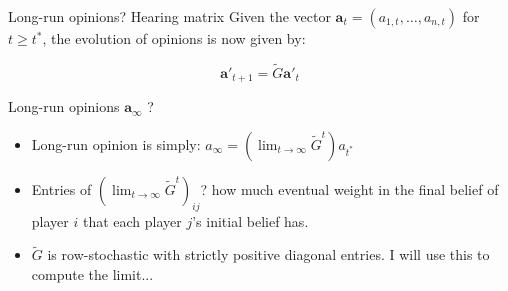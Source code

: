 \documentclass[xcolor=table,handout]{beamer}
\begin{document}
\begin{frame}{Long-run opinions? Hearing matrix}
\vspace{3mm}
Given the vector $\mathbf{a}_t = ( a_{1,t}, \ldots, a_{n,t} )$ for $t \geq t^{*}$, the evolution of opinions is now given by:

\begin{equation}
\mathbf{a'}_{t+1} = \tilde{G} \mathbf{a'}_t
\label{LRlawofmotion}
\end{equation} 
\pause
\begin{tcolorbox}[enhanced,attach boxed title to top center={yshift=-3mm,yshifttext=-1mm}, colback=red!5,colframe=red!40,colbacktitle=red!40 ,fonttitle=\bfseries, boxed title style={size=small,colframe=red!50} ]
 \centering Long-run opinions $\mathbf{a}_{\infty}$ ?   
 \end{tcolorbox}
\pause
\begin{itemize}
\item Long-run opinion is simply: $a_{\infty} = (\lim_{t \rightarrow \infty} \tilde{G}^{t} ) a_{t^{*}}$
\pause
\item  Entries of $(\lim_{t \rightarrow \infty} \tilde{G}^{t} )_{ij}$? how much eventual weight in the final belief of player $i$ that each player $j$'s initial belief has. 
\item $\tilde{G}$ is row-stochastic with strictly positive diagonal entries. I will use this to compute the limit... 

\end{itemize}
\end{frame}
%
\end{document}

